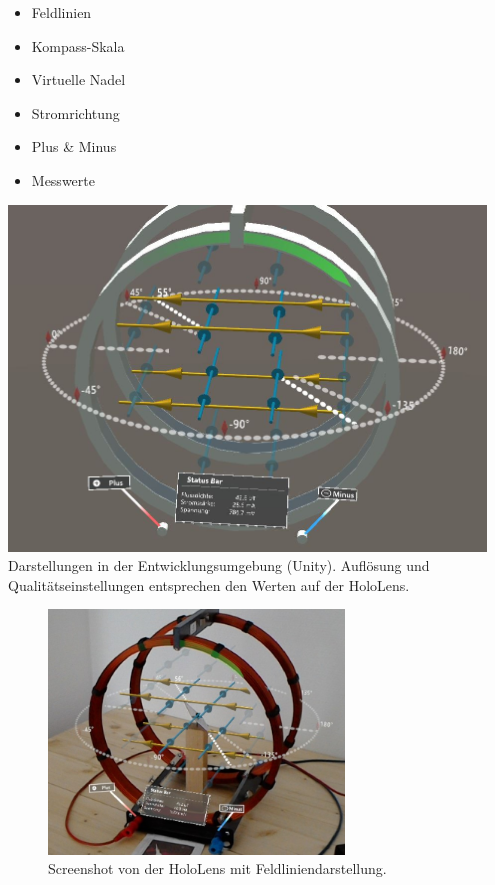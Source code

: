 \begin{frame}[fragile]{}
	\vspace{-10px}
	\begin{minipage}{0.25\textwidth}
		{
			\begin{itemize}[itemsep=1mm]
				\item Feldlinien
				\item Kompass-Skala
				\item Virtuelle Nadel
				\item Stromrichtung
				\item Plus \& Minus
				\item Messwerte
			\end{itemize}
		}
	\end{minipage}
	\begin{minipage}{0.7\textwidth}
		\centering
		\includegraphics[width=0.95\textwidth]{images/unity/overview.jpg}\\
		\scriptsize Darstellungen in der Entwicklungsumgebung (Unity). Auflösung und Qualitätseinstellungen entsprechen den Werten auf der HoloLens.
	\end{minipage}
\end{frame}

\begin{frame}[fragile]{}
\begin{figure}
	\vspace{-10px}
	\centering
	\includegraphics[width=0.7\textwidth]{images/HL/fieldlines_cut.jpg}\\
	\scriptsize Screenshot von der HoloLens mit Feldliniendarstellung.
\end{figure}
\end{frame}

